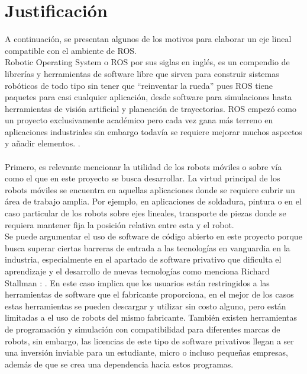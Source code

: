 \section{Justificación}
A continuación, se presentan algunos de los motivos para elaborar un eje lineal compatible con el ambiente de ROS.\\
Robotic Operating System o ROS por sus siglas en inglés, es un compendio de librerías y herramientas de software libre que sirven para construir sistemas robóticos de todo tipo sin tener que “reinventar la rueda” pues ROS tiene paquetes para casi cualquier aplicación, desde software para simulaciones hasta herramientas de visión artificial y planeación de trayectorias. ROS empezó como un proyecto exclusivamente académico pero cada vez gana más terreno en aplicaciones industriales sin embargo todavía se requiere mejorar muchos aspectos y añadir elementos. \cite{Referencia6}.\\
\\Primero, es relevante mencionar la utilidad de los robots móviles o sobre vía como el que en este proyecto se busca desarrollar. La virtud principal de los robots móviles se encuentra en aquellas aplicaciones donde se requiere cubrir un área de trabajo amplia. Por ejemplo, en aplicaciones de soldadura, pintura o en el caso particular de los robots sobre ejes lineales, transporte de piezas donde se requiera mantener fija la posición relativa entre esta y el robot.
\\Se puede argumentar el uso de software de código abierto en este proyecto porque busca superar ciertas barreras de entrada a las tecnologías en vanguardia en la industria, especialmente en el apartado de software privativo que dificulta el aprendizaje y el desarrollo de nuevas tecnologías como menciona Richard Stallman \cite{Referencia1}: . En este caso implica que los usuarios están restringidos a las herramientas de software que el fabricante proporciona, en el mejor de los casos estas herramientas se pueden descargar y utilizar sin costo alguno, pero están limitadas a el uso de robots del mismo fabricante. También existen herramientas de programación y simulación con compatibilidad para diferentes marcas de robots, sin embargo, las licencias de este tipo de software privativos llegan a ser una inversión inviable para un estudiante, micro o incluso pequeñas empresas, además de que se crea una dependencia hacia estos programas.\\ 

